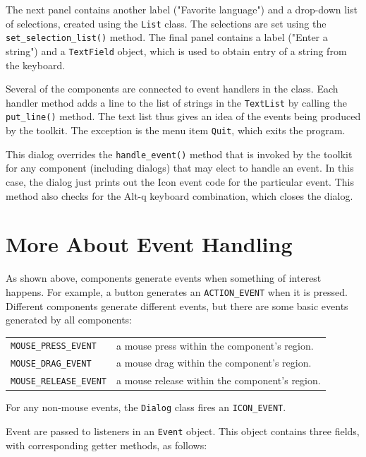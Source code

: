 The next panel contains another label ("Favorite
language") and a drop-down list of selections, created
using the \texttt{List} class. The selections are set using the
\texttt{set\_selection\_list()} method. The final panel contains a
label ("Enter a string") and a
\texttt{TextField} object, which is used to obtain entry of a string
from the keyboard.

Several of the components are connected to event handlers in the class.
Each handler method adds a line to the list of strings in the
\texttt{TextList} by calling the \texttt{put\_line()} method. The text
list thus gives an idea of the events being produced by the toolkit.
The exception is the menu item \texttt{Quit}, which exits the
program.

This dialog overrides the \texttt{handle\_event()} method that is
invoked by the toolkit for any component (including dialogs)
that may elect to handle an event. In this case, the dialog just
prints out the Icon event code for the particular event. This method
also checks for the Alt-q keyboard combination, which closes the
dialog.

\section{More About Event Handling}

As shown above, components generate events when
something of interest happens. For example, a button generates an
\texttt{ACTION\_EVENT} when it is pressed. Different components
generate different events, but there are some basic events generated by
all components:

\vspace{0.15in}
\begin{xtabular}{m{2.2in} m{3.5in}}
\texttt{MOUSE\_PRESS\_EVENT} &
 a mouse press within the component's
region.\\
\texttt{MOUSE\_DRAG\_EVENT} &
 a mouse drag within the component's
region.\\
\texttt{MOUSE\_RELEASE\_EVENT} &
 a mouse release within the component's
region.\\
\end{xtabular}
\vspace{0.15in}

\noindent For any non-mouse events, the \texttt{Dialog} class fires an
\texttt{ICON\_EVENT}.

Event are passed to listeners in an \texttt{Event}
object. This object contains three fields,
with corresponding getter methods, as follows:

